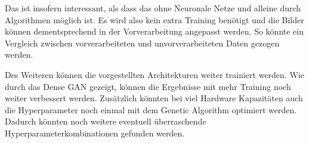 Das ist insofern interessant, als dass das ohne Neuronale Netze und alleine durch Algorithmen möglich ist.
Es wird also kein extra Training benötigt und die Bilder können dementsprechend in der Vorverarbeitung angepasst werden.
So könnte ein Vergleich zwischen vorverarbeiteten und unvorverarbeiteten Daten gezogen werden.
\newline

Des Weiteren können die vorgestellten Architekturen weiter trainiert werden.
Wie durch das Dense GAN gezeigt, können die Ergebnisse mit mehr Training noch weiter verbessert werden.
Zusätzlich könnten bei viel Hardware Kapazitäten auch die Hyperparameter noch einmal mit dem Genetic Algorithm optimiert werden.
Dadurch könnten noch weitere eventuell überraschende Hyperparameterkombinationen gefunden werden.
